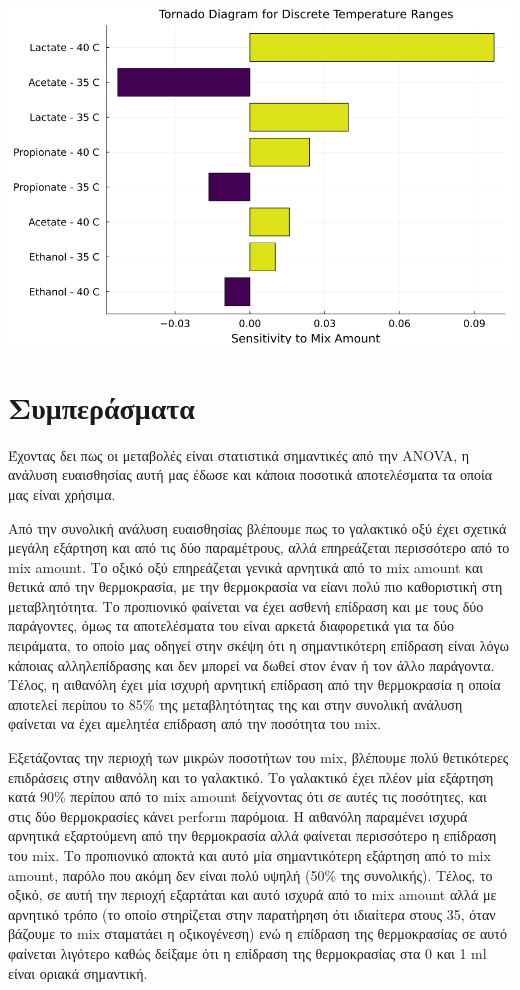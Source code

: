 \documentclass[11pt]{article}
\begin{document}
\begin{center}
\includegraphics[width=.9\linewidth]{../plots/sensitivity/temperature_tornado.png}
\end{center}

\section{Συμπεράσματα}
\label{sec:orgd4a20bc}
Έχοντας δει πως οι μεταβολές είναι στατιστικά σημαντικές από την ANOVA, η ανάλυση ευαισθησίας αυτή μας έδωσε και κάποια ποσοτικά αποτελέσματα τα οποία μας είναι χρήσιμα.

Από την συνολική ανάλυση ευαισθησίας βλέπουμε πως το γαλακτικό οξύ έχει σχετικά μεγάλη εξάρτηση και από τις δύο παραμέτρους, αλλά επηρεάζεται περισσότερο από το mix amount. Το οξικό οξύ επηρεάζεται γενικά αρνητικά από το mix amount και θετικά από την θερμοκρασία, με την θερμοκρασία να είανι πολύ πιο καθοριστική στη μεταβλητότητα. Το προπιονικό φαίνεται να έχει ασθενή επίδραση και με τους δύο παράγοντες, όμως τα αποτελέσματα του είναι αρκετά διαφορετικά για τα δύο πειράματα, το οποίο μας οδηγεί στην σκέψη ότι η σημαντικότερη επίδραση είναι λόγω κάποιας αλληλεπίδρασης και δεν μπορεί να δωθεί στον έναν ή τον άλλο παράγοντα. Τέλος, η αιθανόλη έχει μία ισχυρή αρνητική επίδραση από την θερμοκρασία η οποία αποτελεί περίπου το 85\% της μεταβλητότητας της και στην συνολική ανάλυση φαίνεται να έχει αμελητέα επίδραση από την ποσότητα του mix.

Εξετάζοντας την περιοχή των μικρών ποσοτήτων του mix, βλέπουμε πολύ θετικότερες επιδράσεις στην αιθανόλη και το γαλακτικό. Το γαλακτικό έχει πλέον μία εξάρτηση κατά 90\% περίπου από το mix amount δείχνοντας ότι σε αυτές τις ποσότητες, και στις δύο θερμοκρασίες κάνει perform παρόμοια. Η αιθανόλη παραμένει ισχυρά αρνητικά εξαρτούμενη από την θερμοκρασία αλλά φαίνεται περισσότερο η επίδραση του mix. Το προπιονικό αποκτά και αυτό μία σημαντικότερη εξάρτηση από το mix amount, παρόλο που ακόμη δεν είναι πολύ υψηλή (50\% της συνολικής). Τέλος, το οξικό, σε αυτή την περιοχή εξαρτάται και αυτό ισχυρά από το mix amount αλλά με αρνητικό τρόπο (το οποίο στηρίζεται στην παρατήρηση ότι ιδιαίτερα στους 35, όταν βάζουμε το mix σταματάει η οξικογένεση) ενώ η επίδραση της θερμοκρασίας σε αυτό φαίνεται λιγότερο καθώς δείξαμε ότι η επίδραση της θερμοκρασίας στα 0 και 1 ml είναι οριακά σημαντική.
\end{document}
